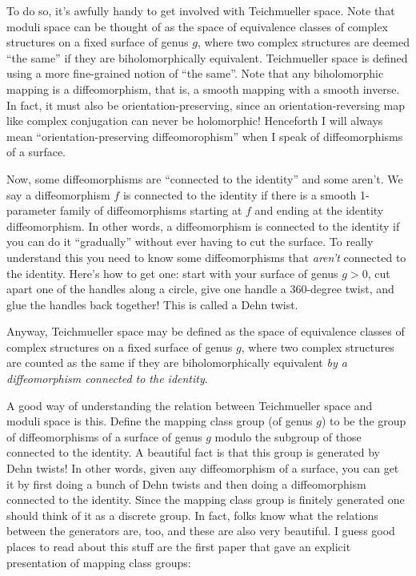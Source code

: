 \documentclass{article}
\begin{document}
To do so, it's awfully handy to get involved with Teichmueller space.
Note that moduli space can be thought of as the space of equivalence
classes of complex structures on a fixed surface of genus \(g\), where
two complex structures are deemed ``the same'' if they are
biholomorphically equivalent. Teichmueller space is defined using a more
fine-grained notion of ``the same''. Note that any biholomorphic mapping
is a diffeomorphism, that is, a smooth mapping with a smooth inverse. In
fact, it must also be orientation-preserving, since an
orientation-reversing map like complex conjugation can never be
holomorphic! Henceforth I will always mean ``orientation-preserving
diffeomorophism'' when I speak of diffeomorphisms of a surface.

Now, some diffeomorphisms are ``connected to the identity'' and some
aren't. We say a diffeomorphism \(f\) is connected to the identity if
there is a smooth 1-parameter family of diffeomorphisms starting at
\(f\) and ending at the identity diffeomorphism. In other words, a
diffeomorphism is connected to the identity if you can do it
``gradually'' without ever having to cut the surface. To really
understand this you need to know some diffeomorphisms that \emph{aren't}
connected to the identity. Here's how to get one: start with your
surface of genus \(g > 0\), cut apart one of the handles along a circle,
give one handle a 360-degree twist, and glue the handles back together!
This is called a Dehn twist.

Anyway, Teichmueller space may be defined as the space of equivalence
classes of complex structures on a fixed surface of genus \(g\), where
two complex structures are counted as the same if they are
biholomorphically equivalent \emph{by a diffeomorphism connected to the
identity}.

A good way of understanding the relation between Teichmueller space and
moduli space is this. Define the mapping class group (of genus \(g\)) to
be the group of diffeomorphisms of a surface of genus \(g\) modulo the
subgroup of those connected to the identity. A beautiful fact is that
this group is generated by Dehn twists! In other words, given any
diffeomorphism of a surface, you can get it by first doing a bunch of
Dehn twists and then doing a diffeomorphism connected to the identity.
Since the mapping class group is finitely generated one should think of
it as a discrete group. In fact, folks know what the relations between
the generators are, too, and these are also very beautiful. I guess good
places to read about this stuff are the first paper that gave an
explicit presentation of mapping class groups:
\end{document}
